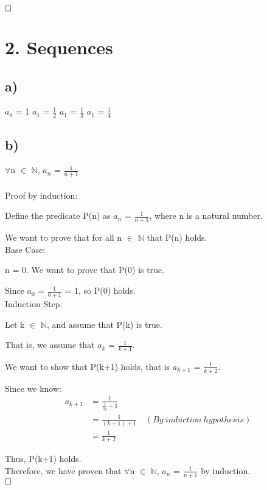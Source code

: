 \documentclass[12pt]{article}
\begin{document}
$\hfill\square$ 
\newpage

\vspace{20pt}

\section*{2. Sequences}
\subsection*{a)}
$a_{0}$ = 1 \quad  $a_{1}$ = $\frac{1}{2}$ \quad $a_{1}$ =  $\frac{1}{3}$  \quad $a_{1}$ = $\frac{1}{4}$


\subsection*{b)}
\vspace{20pt}
$\forall$n $\in$ $\mathbb{N}$, $a_{n}$ = $\frac{1}{n + 1}$ \\
~\\
Proof by induction: 

Define the predicate P(n) as $a_{n}$ = $\frac{1}{n + 1}$, where n is a natural number.

We want to prove that for all n $\in$ $\mathbb{N}$ that P(n) holds. \\
Base Case:

n = 0. We want to prove that P(0) is true.

Since $a_{0}$ = $\frac{1}{0 + 1}$ = 1, so P(0) holds. \\
Induction Step:

Let k $\in$ $\mathbb{N}$, and assume that P(k) is true.

That is, we assume that $a_{k}$ = $\frac{1}{k+1}$.

We want to show that P(k+1) holds, that is $a_{k+1}$ = $\frac{1}{k + 2}$.

Since we know:
\begin{align*}
a_{k+1} &= \frac{1}{\frac{1}{a_{k}}+1} \\
&= \frac{1}{(k+1)+1}  \quad (By \ induction \ hypothesis) \\
&= \frac{1}{k+2}
\end{align*}

Thus, P(k+1) holds.\\
Therefore, we have proven that $\forall$n $\in$ $\mathbb{N}$, $a_{n}$ = $\frac{1}{n + 1}$ by induction. \\

$\hfill\square$
\end{document}
